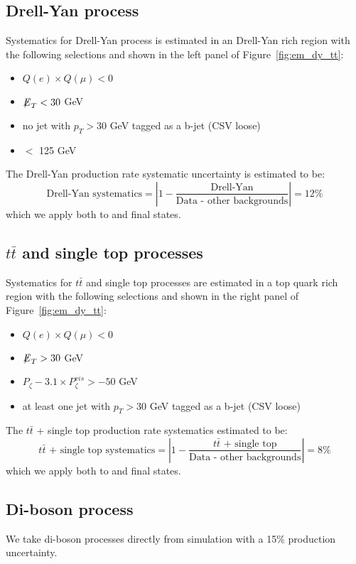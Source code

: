 \subsection{Drell-Yan process}\label{sec:em_DY}
Systematics for Drell-Yan process is estimated in an Drell-Yan rich 
region with the following selections and shown in the left panel of 
Figure~\ref{fig:em_dy_tt}:
\begin{itemize}
  \item $Q(e) \times Q(\mu) < 0$
  \item ${\not\mathrel{E}}_T<30$ GeV
  \item no jet with $p_T>30$ GeV tagged as a b-jet (CSV loose)
  \item \meffemu $<$ 125 GeV
\end{itemize}
The Drell-Yan production rate systematic uncertainty is estimated to
be:
\begin{equation}\label{eq:DY}
\text{Drell-Yan systematics} = \left| 1 - \frac{\text{Drell-Yan}}{\text{Data - other backgrounds}}\right| = 12\%
\end{equation}
which we apply both to \tetm and \teth final states.

\subsection{$t\bar{t}$ and single top processes}\label{sec:em_tt}
Systematics for $t\bar{t}$ and single top processes are estimated in a
top quark rich region with the following selections and shown in the
right panel of Figure~\ref{fig:em_dy_tt}:
\begin{itemize}
  \item $Q(e) \times Q(\mu) < 0$
  \item ${\not\mathrel{E}}_T>30$ GeV
  \item $P_{\zeta}- 3.1 \times P_{\zeta}^{vis} > -50$ GeV
  \item at least one jet with $p_T>30$ GeV tagged as a b-jet (CSV loose)
\end{itemize}
The $t\bar{t}$ + single top production rate systematics estimated to be:
\begin{equation}\label{eq:em_tt}
\text{$t\bar{t}$ + single top systematics} = \left| 1 - \frac{\text{$t\bar{t}$ + single top}}{\text{Data - other backgrounds}}\right| = 8\%
\end{equation}
which we apply both to \tetm and \teth final states.

\subsection{Di-boson process}
We take di-boson processes directly from simulation with a 15\% production uncertainty.


